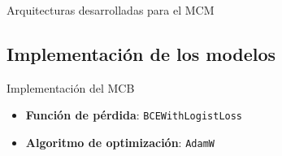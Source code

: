 \begin{frame}{Arquitecturas desarrolladas para el MCM}
\end{frame}

\subsection{Implementación de los modelos}
\begin{frame}{Implementación del MCB}
	\begin{itemize}
		\item \textbf{Función de pérdida}: \texttt{BCEWithLogistLoss}
		\item \textbf{Algoritmo de optimización}: \texttt{AdamW}
	\end{itemize}
	
	
	\begin{table}[H]
		\centering 
		\caption{Valores de los hiperparámetros utilizados en los experimentos del modelo de clasificación binaria.}
		\label{tab:hiperBIN}
	\end{table}
\end{frame}

